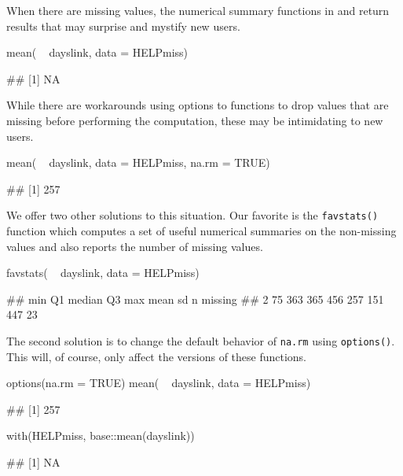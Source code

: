 When there are missing values, the numerical summary functions in
 and  return results that may surprise and mystify
new users.

\begin{Schunk}
\begin{Sinput}
mean( ~ dayslink, data = HELPmiss)
\end{Sinput}
\begin{Soutput}
## [1] NA
\end{Soutput}
\end{Schunk}

\noindent
While there are workarounds using options to functions to drop values
that are missing before performing the computation, these may be
intimidating to new users.

\begin{Schunk}
\begin{Sinput}
mean( ~ dayslink, data = HELPmiss, na.rm = TRUE)
\end{Sinput}
\begin{Soutput}
## [1] 257
\end{Soutput}
\end{Schunk}

We offer two other solutions to this situation. Our favorite is the
\texttt{favstats()} function which computes a set of useful numerical
summaries on the non-missing values and also reports the number of
missing values.

\begin{Schunk}
\begin{Sinput}
favstats( ~ dayslink, data = HELPmiss)
\end{Sinput}
\begin{Soutput}
##  min Q1 median  Q3 max mean  sd   n missing
##    2 75    363 365 456  257 151 447      23
\end{Soutput}
\end{Schunk}

The second solution is to change the default behavior of \texttt{na.rm}
using \texttt{options()}. This will, of course, only affect the
 versions of these functions.

\begin{Schunk}
\begin{Sinput}
options(na.rm = TRUE)
mean( ~ dayslink, data = HELPmiss)
\end{Sinput}
\begin{Soutput}
## [1] 257
\end{Soutput}
\begin{Sinput}
with(HELPmiss, base::mean(dayslink))
\end{Sinput}
\begin{Soutput}
## [1] NA
\end{Soutput}
\end{Schunk}

